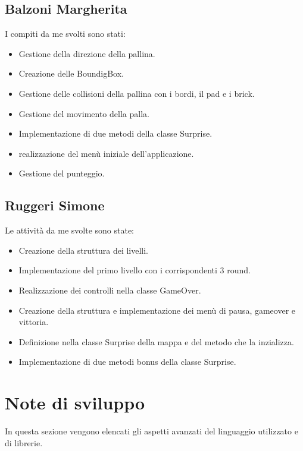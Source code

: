 \documentclass[a4paper,12pt]{report}
\begin{document}
\subsection{Balzoni Margherita}
I compiti da me svolti sono stati:
\begin{itemize}
    \item Gestione della direzione della pallina.
    \item Creazione delle BoundigBox.
    \item Gestione delle collisioni della pallina con i bordi, il pad e i brick.
    \item Gestione del movimento della palla.
    \item Implementazione di due metodi della classe Surprise.
    \item realizzazione del menù iniziale dell'applicazione.
    \item Gestione del punteggio.
\end{itemize}
\subsection{Ruggeri Simone}
Le attività da me svolte sono state:
\begin{itemize}
    \item Creazione della struttura dei livelli.
    \item Implementazione del primo livello con i corrispondenti 3 round.
    \item Realizzazione dei controlli nella classe GameOver.
    \item Creazione della struttura e implementazione dei menù di pausa, gameover e vittoria.
    \item Definizione nella classe Surprise della mappa e del metodo che la inzializza.
    \item Implementazione di due metodi bonus della classe Surprise.
\end{itemize}

\section{Note di sviluppo}
In questa sezione vengono elencati gli aspetti avanzati del linguaggio utilizzato e di librerie.
\end{document}

